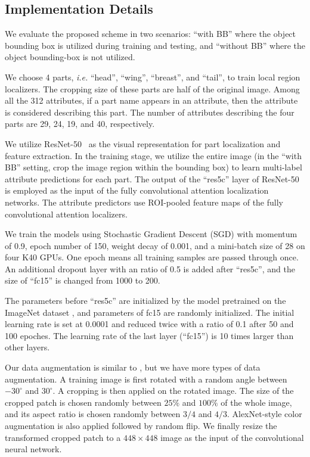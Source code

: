 \documentclass{article}
\begin{document}
\subsection{Implementation Details}
We evaluate the proposed scheme in two scenarios: ``with BB'' where the object bounding box is utilized during training and testing,
and ``without BB'' where the object bounding-box is not utilized.

We choose 4 parts, \emph{i.e.} ``head'', ``wing'', ``breast'', and ``tail'', to train local region localizers.
The cropping size of these parts are half of the original image.
Among all the 312 attributes, if a part name appears in an attribute, then the attribute is considered describing this part.
The number of attributes describing the four parts are 29, 24, 19, and 40, respectively.

We utilize ResNet-50~\cite{nips2} as the visual representation for part localization and feature extraction.
In the training stage, we utilize the entire image (in the ``with BB'' setting, crop the image region within the bounding box) to learn multi-label attribute predictions for each part.
The output of the ``res5c'' layer of ResNet-50 is employed as the input of the fully convolutional attention localization networks. The attribute predictors use ROI-pooled feature maps \cite{girshick2015fast} of the fully convolutional attention localizers.

We train the models using Stochastic Gradient Descent (SGD) with momentum of 0.9, epoch number of 150, weight decay of 0.001, and a mini-batch size of 28 on four K40 GPUs.
One epoch means all training samples are passed through once.
An additional dropout layer with an ratio of 0.5 is added after ``res5c'', and the size of ``fc15'' is changed from 1000 to 200.

The parameters before ``res5c'' are initialized by the model \cite{nips2} pretrained on the ImageNet dataset \cite{bd18},
and parameters of fc15 are randomly initialized.
The initial learning rate is set at 0.0001 and reduced twice with a ratio of 0.1 after 50 and 100 epoches.
The learning rate of the last layer (``fc15'') is 10 times larger than other layers.

Our data augmentation is similar to \cite{bd7}, but we have more types of data augmentation.
A training image is first rotated with a random angle between $-30^\circ$ and $30^\circ$.
A cropping is then applied on the rotated image. The size of the cropped patch is chosen randomly between $25\%$ and $100\%$ of the whole image, and its aspect ratio is chosen randomly between $3/4$ and $4/3$.
AlexNet-style color augmentation \cite{nips3} is also applied followed by random flip. We finally resize the transformed cropped patch to a $448\times448$ image as the input of the convolutional neural network.
\end{document}
